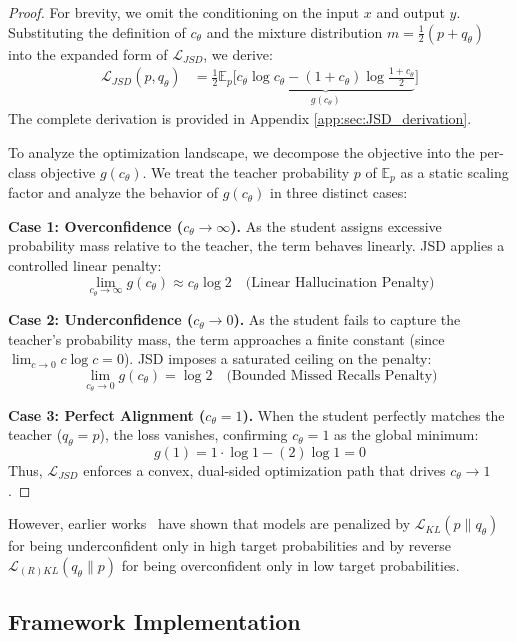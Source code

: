 \documentclass{article}
\theoremstyle{plain}
\theoremstyle{definition}
\theoremstyle{remark}
\begin{document}
\begin{proof}
For brevity, we omit the conditioning on the input $x$ and output $y$. Substituting the definition of $c_\theta$ and the mixture distribution $m = \frac{1}{2}(p + q_\theta)$ into the expanded form of $\mathcal{L}_{JSD}$, we derive:
\begin{align}
    \mathcal{L}_{JSD}(p,q_\theta) &= \frac{1}{2} \mathbb{E}_{p} \Big[ \underbrace{c_\theta \log c_\theta - (1+c_\theta) \log \frac{1+c_\theta}{2}}_{g(c_\theta)} \Big]
\end{align}
The complete derivation is provided in Appendix \cref{app:sec:JSD_derivation}.

To analyze the optimization landscape, we decompose the objective into the per-class objective $g(c_\theta)$. 
We treat the teacher probability $p$ of $\mathbb{E}_p$ as a static scaling factor and analyze the behavior of $g(c_\theta)$ in three distinct cases:

\textbf{Case 1: Overconfidence ($c_{\theta} \to \infty$).} As the student assigns excessive probability mass relative to the teacher, the term behaves linearly. JSD applies a controlled linear penalty:
\[
    \lim_{c_{\theta} \to \infty} g(c_\theta) \approx c_\theta \log 2 \quad \text{(Linear Hallucination Penalty)}
\]

\textbf{Case 2: Underconfidence ($c_{\theta} \to 0$).} As the student fails to capture the teacher's probability mass, the term approaches a finite constant (since $\lim_{c \to 0} c \log c = 0$). JSD imposes a saturated ceiling on the penalty:
\[
    \lim_{c_{\theta} \to 0} g(c_\theta) = \log 2 \quad \text{(Bounded Missed Recalls Penalty)}
\]

\textbf{Case 3: Perfect Alignment ($c_{\theta} = 1$).} When the student perfectly matches the teacher ($q_\theta = p$), the loss vanishes, confirming $c_\theta=1$ as the global minimum:
\[
    g(1) = 1 \cdot \log 1 - (2) \log 1 = 0
\]
Thus, $\mathcal{L}_{JSD}$ enforces a convex, dual-sided optimization path that drives $c_\theta \to 1$.
\end{proof}

However, earlier works~\cite{ko2024distillm,wu2024rethinking} have shown that models are penalized by $\mathcal{L}_{KL}(p \|q_\theta)$ for being underconfident only in high target probabilities and by reverse $\mathcal{L}_{(R)KL}(q_\theta \| p)$ for being overconfident only in low target probabilities.



\subsection{Framework Implementation}
\label{sec:distill_lens for_intermediate_layers}
\end{document}
